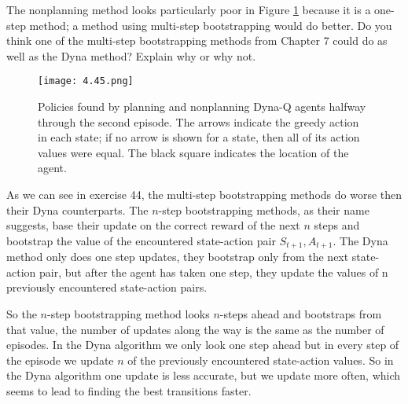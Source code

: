 
\begin{exercise}

The nonplanning method looks particularly poor in Figure \ref{fig:8.3} because it is a one-step method;
a method using multi-step bootstrapping would do better.
Do you think one of the multi-step bootstrapping methods from Chapter 7 could do as well as the Dyna method?
Explain why or why not.

\setcounter{section}{8}
\setcounter{figure}{2}

\begin{figure}[H]
    \centering
    \texttt{[image: 4.45.png]}
    \caption
    {
        Policies found by planning and nonplanning Dyna-Q agents halfway through the second episode.
        The arrows indicate the greedy action in each state;
        if no arrow is shown for a state, then all of its action values were equal.
        The black square indicates the location of the agent.
    }
    \label{fig:8.3}
\end{figure}

\end{exercise}


\begin{solution}

As we can see in exercise 44, the multi-step bootstrapping methods do worse then their Dyna counterparts. The $n$-step bootstrapping methods, as their name suggests, base their update on the correct reward of the next $n$ steps and bootstrap the value of the encountered state-action pair $S_{t+1},A_{t+1}$. The Dyna method only does one step updates, they bootstrap only from the next state-action pair, but after the agent has taken one step, they update the values of n previously encountered state-action pairs.

So the $n$-step bootstrapping method looks $n$-steps ahead and bootstraps from that value, the number of updates along the way is the same as the number of episodes. In the Dyna algorithm we only look one step ahead but in every step of the episode we update $n$ of the previously encountered state-action values. So in the Dyna algorithm one update is less accurate, but we update more often, which seems to lead to finding the best transitions faster.
\end{solution}

